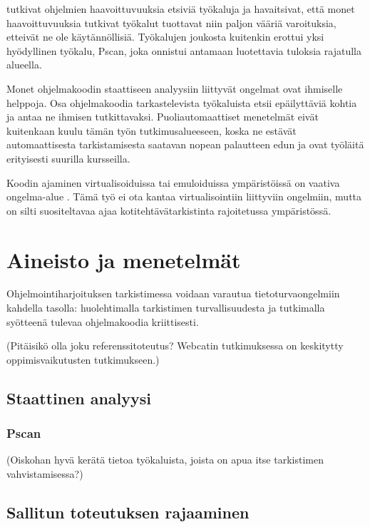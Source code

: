 \citet{heffleymeunier2004} tutkivat ohjelmien haavoittuvuuksia etsiviä työkaluja
ja havaitsivat, että monet haavoittuvuuksia tutkivat työkalut tuottavat niin
paljon vääriä varoituksia, etteivät ne ole käytännöllisiä. Työkalujen joukosta
kuitenkin erottui yksi hyödyllinen työkalu, Pscan, joka onnistui antamaan
luotettavia tuloksia rajatulla alueella. 

Monet ohjelmakoodin staattiseen analyysiin liittyvät ongelmat ovat ihmiselle
helppoja. Osa ohjelmakoodia tarkastelevista työkaluista etsii epäilyttäviä
kohtia ja antaa ne ihmisen tutkittavaksi. \citep{taft2008} Puoliautomaattiset
menetelmät eivät kuitenkaan kuulu tämän työn tutkimusalueeseen, koska ne
estävät automaattisesta tarkistamisesta saatavan nopean palautteen edun ja
ovat työläitä erityisesti suurilla kursseilla.

Koodin ajaminen virtualisoiduissa tai emuloiduissa ympäristöissä on vaativa
ongelma-alue \citep{kesti2010}. Tämä työ ei ota kantaa virtualisointiin
liittyviin ongelmiin, mutta on silti suositeltavaa ajaa kotitehtävätarkistinta
rajoitetussa ympäristössä.


\section{Aineisto ja menetelmät}
\label{sec:aineisto}

Ohjelmointiharjoituksen tarkistimessa voidaan varautua tietoturvaongelmiin
kahdella tasolla: huolehtimalla tarkistimen turvallisuudesta ja tutkimalla
syötteenä tulevaa ohjelmakoodia kriittisesti.

(Pitäisikö olla joku referenssitoteutus? Webcatin tutkimuksessa on keskitytty
oppimisvaikutusten tutkimukseen.)

\subsection{Staattinen analyysi}


\subsubsection{Pscan}

(Oiskohan hyvä kerätä tietoa työkaluista, joista on apua itse tarkistimen
vahvistamisessa?)

\subsection{Sallitun toteutuksen rajaaminen}

